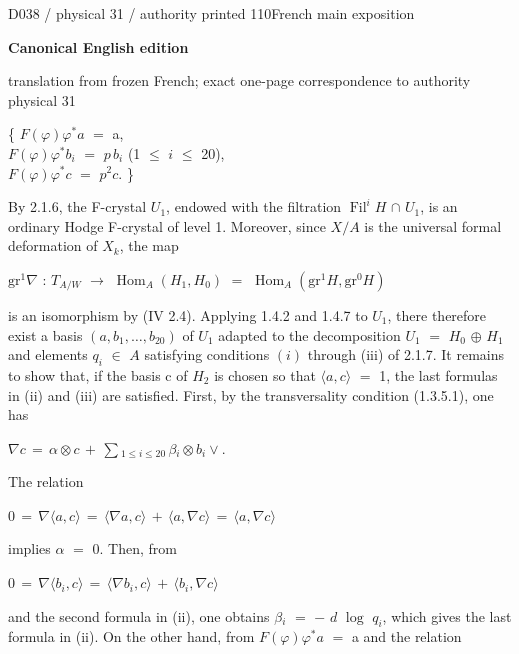 \documentclass[9pt]{article}
\newcommand{\CanonText}[1]{\par{\fontsize{8.0}{9.35}\selectfont\RaggedRight #1\par}\vspace{2.2pt}}
\newcommand{\CanonDisplay}[1]{\par\vspace{1.2pt}\begin{center}{\fontsize{7.2}{8.4}\selectfont\(\displaystyle #1\)}\end{center}\vspace{1.2pt}}
\newcommand{\LayerTitle}{Canonical English edition}
\begin{document}
\noindent\begin{minipage}[t][\dimexpr\textheight-5pt\relax][t]{\textwidth}
{\sffamily\fontsize{7.3}{8.2}\selectfont\color{Quiet} D038 / physical 31 / authority printed 110\hfill French main exposition}
\par{}\vspace{4.5pt}
{\sffamily\fontsize{10.4}{11.6}\selectfont\bfseries\color{Accent} \LayerTitle}
\par{\sffamily\fontsize{6.7}{7.7}\selectfont\color{Quiet} translation from frozen French; exact one-page correspondence to authority physical 31}
\vspace{5pt}
\CanonText{\{ \(F(\varphi{})\varphi{}^{*}a\) \(=\) a,\\\(F(\varphi{})\varphi{}^{*}b_{i}\) \(=\) \(p\,b_{i}\) (1 \(\leq{}\) \(i\) \(\leq{}\) 20),\\\(F(\varphi{})\varphi{}^{*}c\) \(=\) \(p^{2}c\). \}}
\CanonText{By 2.1.6, the F-crystal \(U_{1}\), endowed with the filtration \(\operatorname{Fil}^{i}H\) \(\cap{}\) \(U_{1}\), is an ordinary Hodge F-crystal of level 1. Moreover, since \(X/A\) is the universal formal deformation of \(X_{k}\), the map}
\CanonText{\(\text{gr}^{1}\nabla{}\) : \(T_{A/W}\) \(\to{}\) \(\operatorname{Hom}_{A}(H_{1},H_{0})\) \(=\) \(\operatorname{Hom}_{A}(\text{gr}^{1}H,\text{gr}^{0}H)\)}
\CanonText{is an isomorphism by (IV 2.4). Applying 1.4.2 and 1.4.7 to \(U_{1}\), there therefore exist a basis \((a,b_{1},\ldots{},b_{20})\) of \(U_{1}\) adapted to the decomposition \(U_{1}\) \(=\) \(H_{0}\) \(\oplus{}\) \(H_{1}\) and elements \(q_{i}\) \(\in{}\) \(A\) satisfying conditions \((i)\) through (iii) of 2.1.7. It remains to show that, if the basis c of \(H_{2}\) is chosen so that \(\langle{}a,c\rangle{}\) \(=\) 1, the last formulas in (ii) and (iii) are satisfied. First, by the transversality condition (1.3.5.1), one has}
\CanonDisplay{\nabla{}c\,=\,\alpha{}\otimes{}c\,+\,\sum{}_{1\leq{}i\leq{}20}\,\beta{}_{i}\otimes{}b_{i}\vee{}.}
\CanonText{The relation}
\CanonDisplay{0\,=\,\nabla{}\langle{}a,c\rangle{}\,=\,\langle{}\nabla{}a,c\rangle{}\,+\,\langle{}a,\nabla{}c\rangle{}\,=\,\langle{}a,\nabla{}c\rangle{}}
\CanonText{implies \(\alpha{}\) \(=\) 0. Then, from}
\CanonDisplay{0\,=\,\nabla{}\langle{}b_{i},c\rangle{}\,=\,\langle{}\nabla{}b_{i},c\rangle{}\,+\,\langle{}b_{i},\nabla{}c\rangle{}}
\CanonText{and the second formula in (ii), one obtains \(\beta{}_{i}\) \(=\) \(-\) \(d\) \(\operatorname{log}\) \(q_{i}\), which gives the last formula in (ii). On the other hand, from \(F(\varphi{})\varphi{}^{*}a\) \(=\) a and the relation}

\end{minipage}
\end{document}
